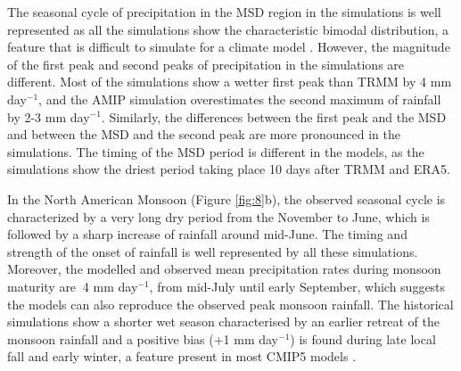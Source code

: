 The seasonal cycle of precipitation in the MSD region in the simulations is well represented as all the simulations show the characteristic bimodal distribution, a feature that is difficult to simulate  for a climate model \citep{ryu2014}.
However, the magnitude of the first peak and second peaks of precipitation in the simulations are different. 
Most of the simulations show a wetter first peak than TRMM by 4 mm day$^{-1}$, and the AMIP simulation overestimates the second maximum of rainfall by 2-3 mm day$^{-1}$. Similarly, the differences between the first peak and the MSD and between the MSD and the second peak are more pronounced in the simulations. The timing of the MSD period is different in the models, as the simulations show the driest period taking place 10 days after TRMM and ERA5. %
  

In the North American Monsoon (Figure \ref{fig:8}b), the observed seasonal cycle is characterized by a very long dry period from the November to June, which is followed by a sharp increase of rainfall around mid-June. The timing and strength of the onset of rainfall is well represented by all these simulations.
Moreover, the modelled and observed mean precipitation rates during monsoon maturity are $~$4 mm day$^{-1}$, from mid-July until early September, which suggests  the models can also reproduce the observed peak monsoon rainfall.
   The historical simulations show a shorter wet season characterised by an earlier retreat of the monsoon rainfall and a positive bias (+1 mm day$^{-1}$) is found during late local fall and early winter, a feature present in most CMIP5 models \citep{geil2013}. %


